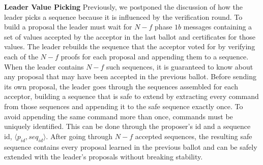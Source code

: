 \textbf{Leader Value Picking} Previously, we postponed the discussion of how the leader picks a sequence because it is influenced by the verification round. To build a proposal the leader must wait for $N-f$ phase $1b$ messages containing a set of values accepted by the acceptor in the last ballot and certificates for those values. The leader rebuilds the sequence that the acceptor voted for by verifying each of the $N-f$ proofs for each proposal and appending them to a sequence. When the leader contains $N-f$ such sequences, it is guaranteed to know about any proposal that may have been accepted in the previous ballot. Before sending its own proposal, the leader goes through the sequences assembled for each acceptor, building a sequence that is safe to extend by extracting every command from those sequences and appending it to the safe sequence exactly once. To avoid appending the same command more than once, commands must be uniquely identified. This can be done through the proposer's id and a sequence id, $\langle p_{id}, seq_{id}\rangle$. After going through $N-f$ accepted sequences, the resulting safe sequence contains every proposal learned in the previous ballot and can be safely extended with the leader's proposals without breaking stability.
